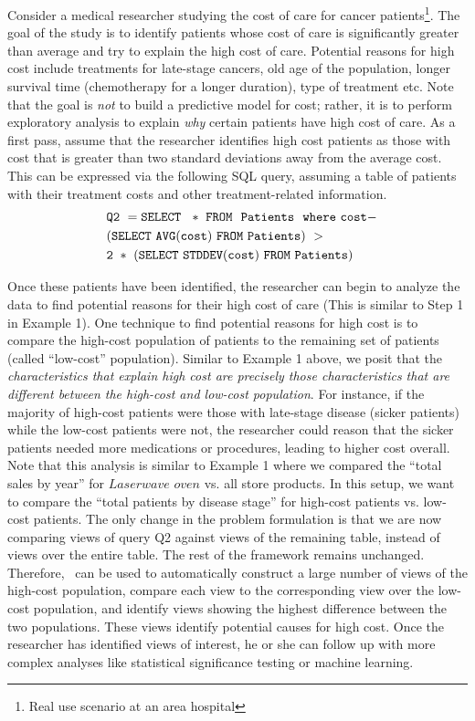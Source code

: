 Consider a medical researcher studying the cost of care for cancer
patients\footnote{Real use scenario at an area hospital}. The goal of the study
is to identify patients whose cost of care is significantly greater than
average and try to explain the high cost of care. Potential reasons for
high cost include treatments for late-stage cancers, old age of the
population, longer survival time (chemotherapy for a longer duration), type of
treatment etc.
Note that the goal is {\it not} to build a predictive model for cost; rather, it
is to perform exploratory analysis to explain {\it why} certain patients have
high cost of care.
As a first pass, assume that the researcher identifies high cost patients as those with
cost that is greater than two standard deviations away from the average
cost. This can be expressed via the following SQL query, assuming a table of
patients with their treatment costs and other treatment-related information.
\begin{align*}
& \tt Q2\ = SELECT \ \ *\ FROM \ \ Patients \ \ where\ cost - \\
  \ \ & \tt (SELECT\ AVG(cost)\ FROM\ Patients)\ >\\
  \ \ & \tt 2\ *\ (SELECT\ STDDEV(cost)\ FROM\ Patients)
\end{align*}

Once these patients have been identified, the researcher can begin to analyze
the data to find potential reasons for their high cost of care (This is similar
to Step 1 in Example 1).
One technique to find potential reasons for high cost is to compare the
high-cost population of patients to the remaining set of patients (called
``low-cost'' population).
Similar to Example 1 above, we posit that the {\it characteristics that
explain high cost are precisely those characteristics that are different between
the high-cost and low-cost population}. 
For instance, if the majority of
high-cost patients were those with late-stage disease (sicker patients) while
the low-cost patients were not, the researcher could reason that the sicker
patients needed more medications or procedures, leading
to higher cost overall. 
Note that this analysis is similar to Example 1 where we
compared the ``total sales by year'' for $Laserwave$ $oven$ vs. all store
products.
In this setup, we want to compare the ``total patients by disease stage'' for
high-cost patients vs. low-cost patients. The only change in the problem
formulation is that we are now comparing views of query Q2 against views of the
remaining table, instead of views over the entire table. The rest of the
framework remains unchanged. Therefore, \SeeDB\ can be used to automatically
construct a large number of views of the high-cost population, compare
each view to the corresponding view over the low-cost population, and
identify views showing the highest difference between the two populations. These
views identify potential causes for high cost. Once the researcher has identified views of interest, he or she
can follow up with more complex analyses like statistical significance testing or machine
learning.

